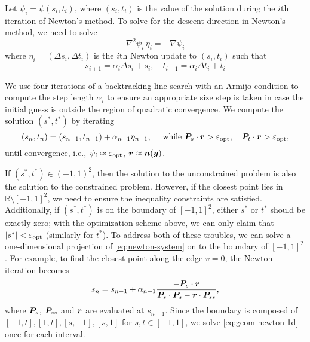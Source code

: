 Let $\psi_i = \psi(s_i,t_i)$, where $(s_i,t_i)$ is the value of the solution during the $i$th iteration of Newton's method.
To solve for the descent direction in Newton's method, we need to solve
\begin{equation}
  \nabla^2 \psi_i \, \eta_i = -\nabla \psi_i
  \label{eq:newton-system}
\end{equation}
where $\eta_i = (\Delta s_i,\Delta t_i)$ is the $i$th Newton update to $(s_i,t_i)$ such that
\begin{equation}
  s_{i+1} = \alpha_i\Delta s_i + s_i,\quad
  t_{i+1} = \alpha_i\Delta t_i + t_i
  \label{}
\end{equation}

We use four iterations of a backtracking line search with an Armijo condition to compute the step length $\alpha_i$ to ensure an appropriate size step is taken in case the initial guess is outside the region of quadratic convergence.
We compute the solution $(s^*, t^*)$ by iterating
\begin{equation}
  (s_n,t_n) = (s_{n-1}, t_{n-1}) + \alpha_{n-1} \eta_{n-1}, \quad \text{ while } {\bm{P}}_s \cdot {\bm{r}} > {\varepsilon_{\mathrm{opt}}}, \quad {\bm{P}}_t \cdot {\bm{r}} > {\varepsilon_{\mathrm{opt}}},
  \label{eq:descent_iter}
\end{equation}
until convergence, i.e., $\psi_i\approx {\varepsilon_{\ensuremath{\mathrm{opt}}}}$, ${\bm{r}} \approx {\bm{n}}({\bm{y}})$.

If $(s^*, t^*) \in (-1,1)^2$, then the solution to the unconstrained problem is also the solution to the constrained problem.
However, if the closest point lies in $\mathbb{R}\setminus [-1,1]^2$, we need to ensure the inequality constraints are satisfied.
Additionally, if $(s^*, t^*)$ is on the boundary of $[-1,1]^2$, either $s^*$ or $t^*$ should be exactly zero; with the optimization scheme above, we can only claim that $|s^*| < {\varepsilon_{\mathrm{opt}}}$ (similarly for $t^*$).
To address both of these troubles, we can solve a one-dimensional projection of \cref{eq:newton-system} on to the boundary of $[-1,1]^2$.
For example, to find the closest point along the edge $v=0$, the Newton iteration becomes
\begin{equation}
  s_n = s_{n-1} + \alpha_{n-1}\frac{-{\bm{P}}_s \cdot {\bm{r}}}{{\bm{P}}_s\cdot {\bm{P}}_s - {\bm{r}}\cdot {\bm{P}}_{ss}},
  \label{eq:geom-newton-1d}
\end{equation}
where ${\bm{P}}_s$, ${\bm{P}}_{ss}$ and ${\bm{r}}$ are evaluated at $s_{n-1}$.
Since the boundary is composed of $[-1,t], [1,t], [s,-1], [s,1]$ for $s,t\in[-1,1]$, we solve \cref{eq:geom-newton-1d} once for each interval.

